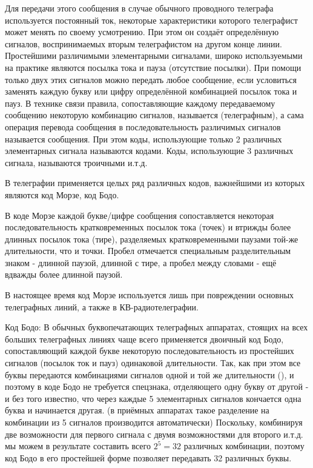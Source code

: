 \documentclass[a4paper,12pt]{report}
\begin{document}
	Для передачи этого сообщения в случае обычного проводного телеграфа используется постоянный ток, некоторые характеристики которого телеграфист может менять по своему усмотрению. При этом он создаёт определённую  сигналов, воспринимаемых вторым телеграфистом на другом конце линии. Простейшими различимыми элементарными сигналами, широко используемыми на практике являются посылка тока и пауза (отсутствие посылки). При помощи только двух этих сигналов можно передать любое сообщение, если условиться заменять каждую букву или цифру определённой комбинацией посылок тока и пауз. В технике связи правила, сопоставляющие каждому передаваемому сообщению  некоторую комбинацию сигналов, называется  (телеграфным), а сама операция перевода сообщения в последовательность различимых сигналов называется  сообщения. При этом коды, использующие только 2 различных элементарных сигнала называются  кодами. Коды, использующие 3 различных сигнала, называются троичными и.т.д.
	
	В телеграфии применяется целых ряд различных кодов, важнейшими из которых являются код Морзе, код Бодо.
	
	В коде Морзе каждой букве/цифре сообщения сопоставляется некоторая последовательность кратковременных посылок тока (точек) и втрижды более длинных посылок тока (тире), разделяемых кратковременными паузами той-же длительности, что и точки. Пробел отмечается специальным разделительным знаком - длинной паузой, длинной с тире, а пробел между словами - ещё вдважды более длинной паузой. 
	
	В настоящее время код Морзе используется лишь при повреждении основных телеграфных линий, а также в КВ-радиотелеграфии.
	
	Код Бодо: В обычных буквопечатающих телеграфных аппаратах, стоящих на всех больших телеграфных линиях чаще всего применяется двоичный код Бодо, сопоставляющий каждой букве некоторую последовательность из  простейших сигналов (посылок ток и пауз) одинаковой длительности. Так, как при этом все буквы передаются комбинациями сигналов одной и той же длительности (), и поэтому в коде Бодо не требуется спецзнака, отделяющего одну букву от другой - и без того известно, что через каждые 5 элементарных сигналов кончается одна буква и начинается другая. (в приёмных аппаратах такое разделение на комбинации из 5 сигналов производится автоматически) Поскольку, комбинируя две возможности для первого сигнала с двумя возможностями для второго и.т.д. мы можем в результате составить всего $2^5 = 32$ различных комбинации, поэтому код Бодо в его простейшей форме позволяет передавать 32 различных буквы.
	
\end{document}
